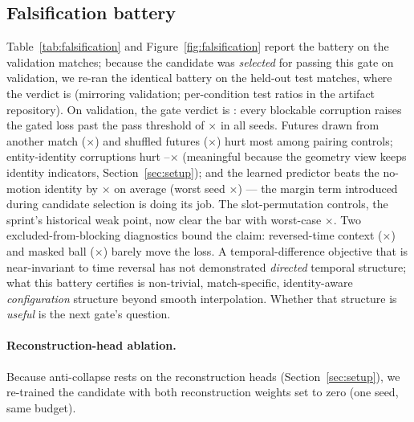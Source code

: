 \documentclass{article}
\begin{document}
\subsection{Falsification battery}
\label{sec:results-falsification}



Table~\ref{tab:falsification} and Figure~\ref{fig:falsification} report the
battery on the validation matches; because the candidate was \emph{selected}
for passing this gate on validation, we re-ran the identical battery on the
held-out test matches, where the verdict is \emph{\FalsTestStatus{}}
(mirroring validation; per-condition test ratios in the artifact
repository). On validation, the gate verdict is \emph{\FalsStatus}: every
blockable corruption raises the gated loss past the pass threshold of
\FalsPassRatio$\times$ in all \NumSeeds{} seeds. Futures drawn from another
match (\FalsWrongMatchMeanRatio$\times$) and shuffled futures
(\FalsShuffledMeanRatio$\times$) hurt most among pairing controls;
entity-identity corruptions hurt
\FalsTeamLabelSwapMeanRatio--\FalsTargetTeamLabelSwapMeanRatio$\times$
(meaningful because the geometry view keeps
identity indicators, Section~\ref{sec:setup}); and the learned predictor beats
the no-motion identity by \FalsNoMotionMeanRatio$\times$ on average (worst
seed \FalsNoMotionMinRatio$\times$) --- the margin term introduced during
candidate selection is doing its job. The slot-permutation controls, the
sprint's historical weak point, now clear the bar with worst-case
\FalsSlotPermMinRatio$\times$. Two excluded-from-blocking diagnostics bound
the claim: reversed-time context (\FalsReversedTimeMeanRatio$\times$) and
masked ball (\FalsMaskedBallMeanRatio$\times$) barely move the loss. A
temporal-difference objective that is near-invariant to time reversal has not
demonstrated \emph{directed} temporal structure; what this battery certifies
is non-trivial, match-specific, identity-aware \emph{configuration} structure
beyond smooth interpolation. Whether that structure is \emph{useful} is the
next gate's question.

\paragraph{Reconstruction-head ablation.}
Because anti-collapse rests on the reconstruction heads
(Section~\ref{sec:setup}), we re-trained the candidate with both
reconstruction weights set to zero (one seed, same budget). \AblationOutcome
\end{document}
